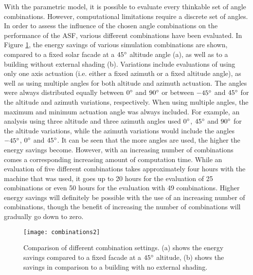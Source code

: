 	With the parametric model, it is possible to evaluate every thinkable set of angle combinations. However, computational limitations require a discrete set of angles. In order to assess the influence of the chosen angle combinations on the performance of the ASF, various different combinations have been evaluated. In Figure \ref{fig:combinations}, the energy savings of various simulation combinations are shown, compared to a fixed solar facade at a $45\degree$ altitude angle (a), as well as to a building without external shading (b). Variations include evaluations of using only one axis actuation (i.e. either a fixed azimuth or a fixed altitude angle), as well as using multiple angles for both altitude and azimuth actuation. The angles were always distributed equally between $0\degree$ and $90\degree$ or between $-45\degree$ and $45\degree$ for the altitude and azimuth variations, respectively. When using multiple angles, the maximum and minimum actuation angle was always included. For example, an analysis using three altitude and three azimuth angles used $0\degree$, $45\degree$ and $90\degree$ for the altitude variations, while the azimuth variations would include the angles $-45\degree$, $0\degree$ and $45\degree$. It can be seen that the more angles are used, the higher the energy savings become. However, with an increasing number of combinations comes a corresponding increasing amount of computation time. While an evaluation of five different combinations takes approximately four hours with the machine that was used, it goes up to 20 hours for the evaluation of 25 combinations or even 50 hours for the evaluation with 49 combinations. Higher energy savings will definitely be possible with the use of an increasing number of combinations, though the benefit of increasing the number of combinations will gradually go down to zero. 
	\begin{figure*}
		\begin{center}
		\texttt{[image: combinations2]}
		\caption{Comparison of different combination settings. (a) shows the energy savings compared to a fixed facade at a $45\degree$ altitude, (b) shows the savings in comparison to a building with no external shading.}
		\label{fig:combinations}
		\end{center}
	\end{figure*}
	
